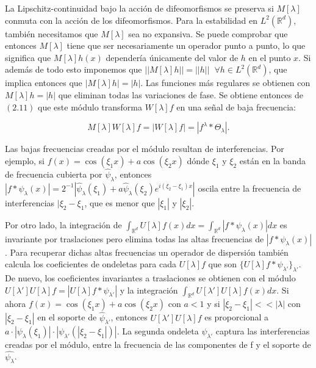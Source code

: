 \noindent La Lipschitz-continuidad bajo la acción de difeomorfismos se preserva si $M[\lambda]$ conmuta con la acción de los difeomorfismos. Para la estabilidad en $L^2(\mathbb{R}^d)$, también necesitamos que $M[\lambda]$ sea no expansiva. Se puede comprobar que entonces $M[\lambda]$ tiene que ser necesariamente un operador punto a punto, lo que significa que $M[\lambda]h(x)$ dependería únicamente del valor de $h$ en el punto $x$. Si además de todo esto imponemos que $||M[\lambda]h||=||h|| \; \; \forall h \in L^2(\mathbb{R}^d)$, que implica entonces que $|M[\lambda]h|=|h|$. Las funciones más regulares se obtienen con $M[\lambda]h=|h|$ que eliminan todas las variaciones de fase. Se obtiene entonces de $(2.11)$ que este módulo transforma $W[\lambda]f$ en una señal de baja frecuencia:

$$M[\lambda]W[\lambda]f=|W[\lambda]f|=|f^\lambda \ast \Theta_\lambda|.$$


\noindent Las bajas frecuencias creadas por el módulo resultan de interferencias. Por ejemplo, si $f(x)=\cos(\xi_1 x)+a\cos(\xi_2 x)$ dónde $\xi_1$ y $\xi_2$ están en la banda de frecuencia cubierta por $\widehat{\psi}_\lambda$, entonces $|f \ast \psi_\lambda (x) |=2^{-1} |\widehat{\psi}_\lambda(\xi_1)+a\widehat{\psi}_\lambda(\xi_2)e^{i(\xi_2-\xi_1)x}|$ oscila entre la frecuencia de interferencias $|\xi_2-\xi_1$, que es menor que $|\xi_1|$ y $|\xi_2|$.

\medskip

\noindent Por otro lado, la integración de $\int_{\mathbb{R}^d}U[\lambda]f(x) dx= \int_{\mathbb{R}^d} | f \ast \psi_\lambda(x)|dx$ es invariante por traslaciones pero elimina todas las altas frecuencias de $|f \ast \psi_\lambda(x)|$. Para recuperar dichas altas frecuencias un operador de dispersión también calcula los coeficientes de ondeletas para cada $U[\lambda]f$ que son $\lbrace U[\lambda]f \ast \psi_{\lambda'}\rbrace_{\lambda'}$. De nuevo, los coeficientes invariantes a traslaciones se obtienen con el módulo $U[\lambda']U[\lambda]f=|U[\lambda]f \ast \psi_{\lambda'}|$ y la integración $\int_{\mathbb{R}^d} U[\lambda']U[\lambda]f(x) dx$. Si ahora $f(x)=\cos(\xi_1 x)+a\cos(\xi_2 x)$ con $a<1$ y si $|\xi_2-\xi_1| << |\lambda|$ con $|\xi_2 - \xi_1|$ en el soporte de $\widehat{\psi}_{\lambda'}$, entonces $U[\lambda']U[\lambda]f$ es proporcional a $a\cdot |\psi_\lambda(\xi_1)|\cdot |\psi_{\lambda'}(|\xi_2-\xi_1|)|$. La segunda ondeleta $\widehat{\psi}_{\lambda'}$ captura las interferencias creadas por el módulo, entre la frecuencia de las componentes de f y el soporte de $\widehat{\psi_\lambda}$.

